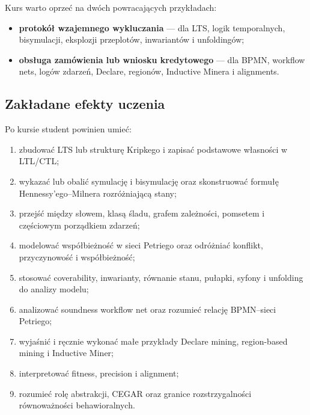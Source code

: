 \documentclass[11pt,a4paper]{article}
\begin{document}
Kurs warto oprzeć na dwóch powracających przykładach:
\begin{itemize}
\item \textbf{protokół wzajemnego wykluczania} --- dla LTS, logik temporalnych, bisymulacji, eksplozji przeplotów, inwariantów i unfoldingów;
\item \textbf{obsługa zamówienia lub wniosku kredytowego} --- dla BPMN, workflow nets, logów zdarzeń, Declare, regionów, Inductive Minera i alignments.
\end{itemize}

\subsection{Zakładane efekty uczenia}
Po kursie student powinien umieć:
\begin{enumerate}
\item zbudować LTS lub strukturę Kripkego i zapisać podstawowe własności w LTL/CTL;
\item wykazać lub obalić symulację i bisymulację oraz skonstruować formułę Hennessy'ego--Milnera rozróżniającą stany;
\item przejść między słowem, klasą śladu, grafem zależności, pomsetem i częściowym porządkiem zdarzeń;
\item modelować współbieżność w sieci Petriego oraz odróżniać konflikt, przyczynowość i współbieżność;
\item stosować coverability, inwarianty, równanie stanu, pułapki, syfony i unfolding do analizy modelu;
\item analizować soundness workflow net oraz rozumieć relację BPMN--sieci Petriego;
\item wyjaśnić i ręcznie wykonać małe przykłady Declare mining, region-based mining i Inductive Miner;
\item interpretować fitness, precision i alignment;
\item rozumieć rolę abstrakcji, CEGAR oraz granice rozstrzygalności równoważności behawioralnych.
\end{enumerate}
\end{document}
